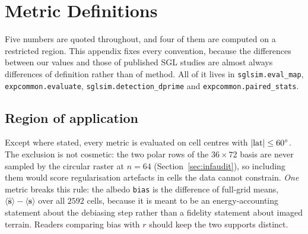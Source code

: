 \documentclass[twocolumn,10pt]{article}
\begin{document}
\appendix

\section{Metric Definitions}
\label{app:metrics}

Five numbers are quoted throughout, and four of them are computed on a
restricted region. This appendix fixes every convention, because the differences
between our values and those of published SGL studies are almost always
differences of definition rather than of method. All of it lives in
{\tt sglsim.eval\_map}, {\tt expcommon.evaluate}, {\tt sglsim.detection\_dprime}
and {\tt expcommon.paired\_stats}.

\subsection{Region of application}
Except where stated, every metric is evaluated on cell centres with
$|{\rm lat}|\le60^\circ$. The exclusion is not cosmetic: the two polar rows of
the $36\times72$ basis are never sampled by the circular raster at $n=64$
(Section~\ref{sec:infaudit}), so including them would score regularisation
artefacts in cells the data cannot constrain. \emph{One} metric breaks this
rule: the albedo \texttt{bias} is the difference of full-grid means,
$\langle\hat{\mathbf{s}}\rangle - \langle\mathbf{s}\rangle$ over all $2592$
cells, because it is meant to be an energy-accounting statement about the
debiasing step rather than a fidelity statement about imaged terrain. Readers
comparing bias with $r$ should keep the two supports distinct.
\end{document}
